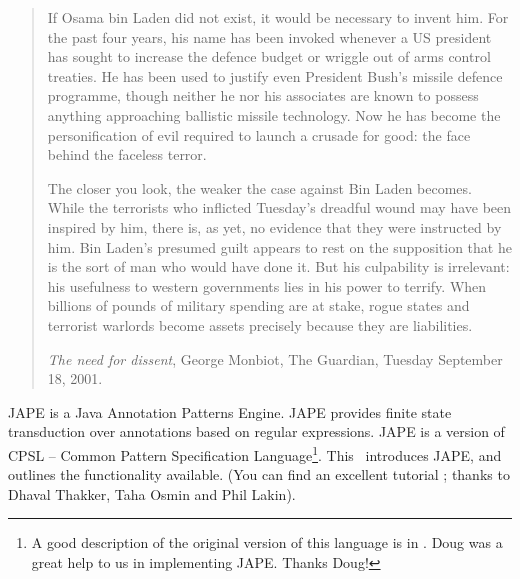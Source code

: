 %
%
%
%


\nnormalsize
\ifprintedbook
\else
\begin{quote}
If Osama bin Laden did not exist, it would be necessary to invent him.
For the past four years, his name has been invoked whenever
a US president has sought to increase the defence budget or wriggle out
of arms control treaties. He has been used to justify even
President Bush's missile defence programme, though neither he nor his
associates are known to possess anything approaching
ballistic missile technology. Now he has become the personification of evil
required to launch a crusade for good: the face behind the
faceless terror.

The closer you look, the weaker the case against Bin Laden becomes. While
the terrorists who inflicted Tuesday's dreadful wound
may have been inspired by him, there is, as yet, no evidence that they
were instructed by him. Bin Laden's presumed guilt appears to
rest on the supposition that he is the sort of man who would have done it.
But his culpability is irrelevant: his usefulness to western
governments lies in his power to terrify. When billions of pounds of
military spending are at stake, rogue states and terrorist warlords
become assets precisely because they are liabilities.

{\it The need for dissent}, George Monbiot, The Guardian,
Tuesday September 18, 2001.
\end{quote}
\fi


JAPE is a Java Annotation Patterns Engine.  JAPE provides finite state
transduction over annotations based on regular expressions.  JAPE is a
version of CPSL -- Common Pattern Specification Language\footnote{A
good description of the original version of this language is in
.  Doug was a great help to us in implementing
JAPE. Thanks Doug!}. This \chapthing\ introduces JAPE, and outlines the
functionality available. (You can find an excellent tutorial
; thanks to Dhaval Thakker, Taha Osmin and Phil Lakin).

